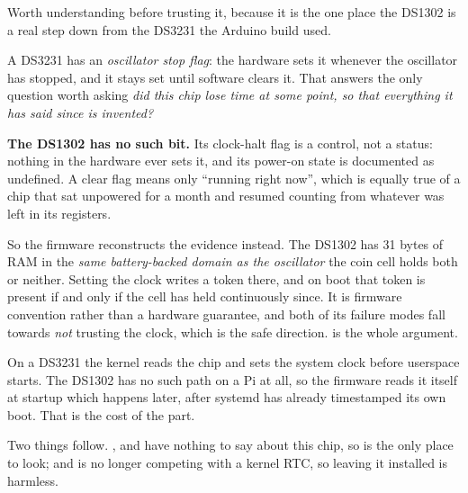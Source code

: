 \documentclass[11pt,a4paper]{article}
\begin{document}
\begin{warnbox}
Worth understanding before trusting it, because it is the one place the DS1302
is a real step down from the DS3231 the Arduino build used.

\vspace{1.5ex}
A DS3231 has an \emph{oscillator stop flag}: the hardware sets it whenever the
oscillator has stopped, and it stays set until software clears it. That answers
the only question worth asking \textemdash{} \emph{did this chip lose time at
some point, so that everything it has said since is invented?}

\vspace{1.5ex}
\textbf{The DS1302 has no such bit.} Its clock-halt flag is a control, not a
status: nothing in the hardware ever sets it, and its power-on state is
documented as undefined. A clear flag means only ``running right now'', which is
equally true of a chip that sat unpowered for a month and resumed counting from
whatever was left in its registers.

\vspace{1.5ex}
So the firmware reconstructs the evidence instead. The DS1302 has 31 bytes of
RAM in the \emph{same battery-backed domain as the oscillator} \textemdash{} the
coin cell holds both or neither. Setting the clock writes a token there, and on
boot that token is present if and only if the cell has held continuously since.
It is firmware convention rather than a hardware guarantee, and both of its
failure modes fall towards \emph{not} trusting the clock, which is the safe
direction.  is the whole argument.
\end{warnbox}

\begin{warnbox}
On a DS3231 the kernel reads the chip and sets the system clock before userspace
starts. The DS1302 has no such path on a Pi at all, so the firmware reads it
itself at startup \textemdash{} which happens later, after systemd has already
timestamped its own boot. That is the cost of the part.

\vspace{1.5ex}
Two things follow. ,  and  have
nothing to say about this chip, so  is the only place to look;
and  is no longer competing with a kernel RTC, so leaving it
installed is harmless.
\end{warnbox}
\end{document}
